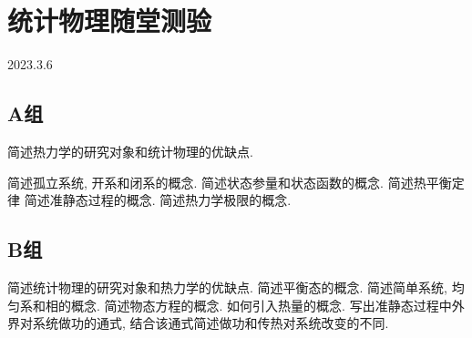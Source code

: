 \section{统计物理随堂测验}
2023.3.6
\subsection{A组}
\begin{questions}
  \question 简述热力学的研究对象和统计物理的优缺点.
  \begin{solution}

  \end{solution}
  \question 简述孤立系统, 开系和闭系的概念.
  \question 简述状态参量和状态函数的概念.
  \question 简述热平衡定律
  \question 简述准静态过程的概念.
  \question 简述热力学极限的概念.
\end{questions}
\subsection{B组}
\begin{questions}
  \question 简述统计物理的研究对象和热力学的优缺点.
  \question 简述平衡态的概念.
  \question 简述简单系统, 均匀系和相的概念.
  \question 简述物态方程的概念.
  \question 如何引入热量的概念.
  \question 写出准静态过程中外界对系统做功的通式, 结合该通式简述做功和传热对系统改变的不同.
\end{questions}